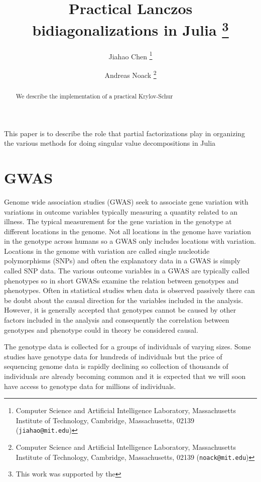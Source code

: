 \documentclass[final,leqno]{siamltex1213}
\title{Practical Lanczos bidiagonalizations in Julia
    \thanks{This
        work was supported by the
	}}
\author{%
    Jiahao Chen
    \thanks{Computer Science and Artificial Intelligence Laboratory,
           Massachusetts Institute of Technology,
           Cambridge, Massachusetts, 02139 ({\tt jiahao@mit.edu})}
    \and
    Andreas Noack
    \thanks{Computer Science and Artificial Intelligence Laboratory,
            Massachusetts Institute of Technology,
            Cambridge, Massachusetts, 02139 ({\tt noack@mit.edu})}
}
\begin{document}
\maketitle

\begin{abstract}
We describe the implementation of a practical Krylov-Schur
\end{abstract}

\begin{keywords}
\end{keywords}

\begin{AMS}
\end{AMS}

\pagestyle{myheadings}
\thispagestyle{plain}

\listoftodos

This paper is to describe the role that partial factorizations play in
organizing the various methods for doing singular value decompositions in
Julia


\section{GWAS}
Genome wide association studies (GWAS) seek to associate gene variation with variations in outcome variables typically measuring a quantity related to an illness. The typical measurement for the gene variation in the genotype at different locations in the genome. Not all locations in the genome have variation in the genotype across humans so a GWAS only includes locations with variation. Locations in the genome with variation are called single nucleotide polymorphisms (SNPs) and often the explanatory data in a GWAS is simply called SNP data. The various outcome variables in a GWAS are typically called phenotypes so in short GWASs examine the relation between genotypes and phenotypes. Often in statistical studies when data is observed passively there can be doubt about the causal direction for the variables included in the analysis. However, it is generally accepted that genotypes cannot be caused by other factors included in the analysis and consequently the correlation between genotypes and phenotype could in theory be considered causal.

The genotype data is collected for a groups of individuals of varying sizes. Some studies have genotype data for hundreds of individuals but the price of sequencing genome data is rapidly declining so collection of thousands of individuals are already becoming common and it is expected that we will soon  have access to genotype data for millions of individuals.
\end{document}
